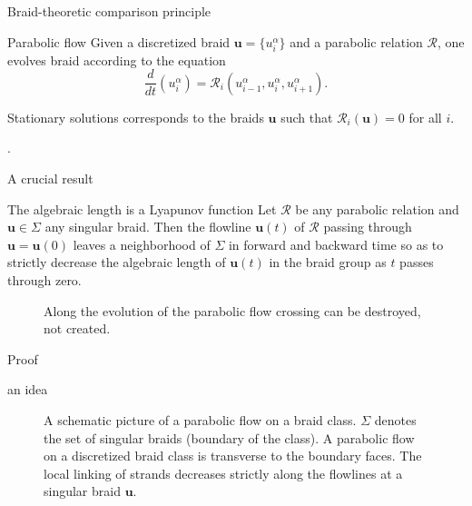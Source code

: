 \documentclass[9pt, english]{beamer}
\theoremstyle{definition}
\newcommand{\simbolovettore}[1]{{\boldsymbol{#1}}}
\newcommand{\vu}{\simbolovettore{u}}
\begin{document}
\begin{frame}{Braid-theoretic comparison principle}
    \begin{block}{Parabolic flow}\pause
    Given a discretized braid $\vu=\{u_i^\alpha\}$ and a parabolic
    relation $\mathscr R$, one evolves braid according to the
    equation
    \[
    \dfrac{d}{dt}(u_i^\alpha)= \mathscr R_i(u_{i-1}^\alpha, u_i^\alpha,
    u_{i+1}^\alpha).
    \]
    \end{block}\pause
    \begin{block}{Stationary solutions}\pause
    corresponds to the braids $\vu$ such that $\mathscr R_i(\vu)=0$
    for all $i$. \pause

    {\color{green}{The parabolic relation $\mathscr R$ induces a flow on $\mathscr D_d^n$ which
    respects a braid-theoretic comparison principle}.\/}
    \end{block}
\end{frame}
\begin{frame}{A crucial result}\pause
    \begin{block}{The algebraic length is a Lyapunov function}
        Let $\mathscr R$ be any parabolic relation and $\vu \in \Sigma$
        any singular braid. Then the flowline $\vu(t)$ of $\mathscr R$
        passing through $\vu=\vu(0)$ leaves  a neighborhood of $\Sigma$
        in forward and backward time so as to strictly decrease the
        algebraic length of $\vu(t)$ in the braid group as $t$ passes
        through zero.
    \end{block}
        \begin{figure}\label{fig:crossing}
        \caption{Along the evolution of the parabolic flow crossing can be
        destroyed, not created.}
        \end{figure}
\end{frame}
\begin{frame}{Proof}
    \begin{block}{an idea}
    \begin{figure}\label{fig:idea}
        \caption{A schematic picture of a parabolic flow on
        a braid class. $\Sigma$ denotes the set of singular braids (boundary of the class). A parabolic flow on a discretized
        braid class is transverse to the boundary faces. The local linking of strands decreases strictly along the
        flowlines at a singular braid $\vu$.}
        \end{figure}
    \end{block}
\end{frame}
\end{document}

